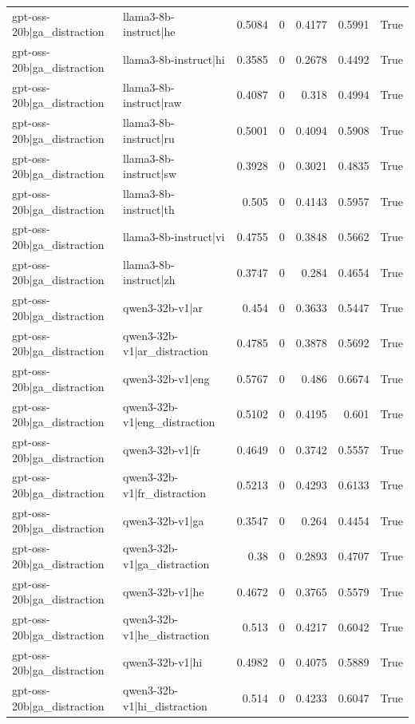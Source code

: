 \begin{table}
\begin{tabular}{l l r r r r l}
gpt-oss-20b|ga_distraction & llama3-8b-instruct|he & 0.5084 & 0 & 0.4177 & 0.5991 & True \\
gpt-oss-20b|ga_distraction & llama3-8b-instruct|hi & 0.3585 & 0 & 0.2678 & 0.4492 & True \\
gpt-oss-20b|ga_distraction & llama3-8b-instruct|raw & 0.4087 & 0 & 0.318 & 0.4994 & True \\
gpt-oss-20b|ga_distraction & llama3-8b-instruct|ru & 0.5001 & 0 & 0.4094 & 0.5908 & True \\
gpt-oss-20b|ga_distraction & llama3-8b-instruct|sw & 0.3928 & 0 & 0.3021 & 0.4835 & True \\
gpt-oss-20b|ga_distraction & llama3-8b-instruct|th & 0.505 & 0 & 0.4143 & 0.5957 & True \\
gpt-oss-20b|ga_distraction & llama3-8b-instruct|vi & 0.4755 & 0 & 0.3848 & 0.5662 & True \\
gpt-oss-20b|ga_distraction & llama3-8b-instruct|zh & 0.3747 & 0 & 0.284 & 0.4654 & True \\
gpt-oss-20b|ga_distraction & qwen3-32b-v1|ar & 0.454 & 0 & 0.3633 & 0.5447 & True \\
gpt-oss-20b|ga_distraction & qwen3-32b-v1|ar_distraction & 0.4785 & 0 & 0.3878 & 0.5692 & True \\
gpt-oss-20b|ga_distraction & qwen3-32b-v1|eng & 0.5767 & 0 & 0.486 & 0.6674 & True \\
gpt-oss-20b|ga_distraction & qwen3-32b-v1|eng_distraction & 0.5102 & 0 & 0.4195 & 0.601 & True \\
gpt-oss-20b|ga_distraction & qwen3-32b-v1|fr & 0.4649 & 0 & 0.3742 & 0.5557 & True \\
gpt-oss-20b|ga_distraction & qwen3-32b-v1|fr_distraction & 0.5213 & 0 & 0.4293 & 0.6133 & True \\
gpt-oss-20b|ga_distraction & qwen3-32b-v1|ga & 0.3547 & 0 & 0.264 & 0.4454 & True \\
gpt-oss-20b|ga_distraction & qwen3-32b-v1|ga_distraction & 0.38 & 0 & 0.2893 & 0.4707 & True \\
gpt-oss-20b|ga_distraction & qwen3-32b-v1|he & 0.4672 & 0 & 0.3765 & 0.5579 & True \\
gpt-oss-20b|ga_distraction & qwen3-32b-v1|he_distraction & 0.513 & 0 & 0.4217 & 0.6042 & True \\
gpt-oss-20b|ga_distraction & qwen3-32b-v1|hi & 0.4982 & 0 & 0.4075 & 0.5889 & True \\
gpt-oss-20b|ga_distraction & qwen3-32b-v1|hi_distraction & 0.514 & 0 & 0.4233 & 0.6047 & True \\

\end{tabular}
\end{table}

